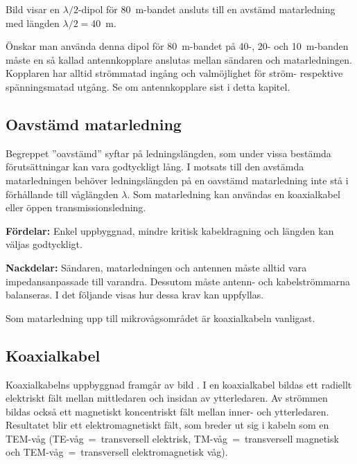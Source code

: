 
Bild  visar en \(\lambda/2\)-dipol för 80~m-bandet ansluts
till en avstämd matarledning med längden \(\lambda/2 = 40\)~m.

Önskar man använda denna dipol för 80~m-bandet på 40-, 20- och 10~m-banden
måste en så kallad antennkopplare anslutas mellan sändaren och matarledningen.
Kopplaren har alltid strömmatad ingång och valmöjlighet för ström- respektive
spänningsmatad utgång.
Se om antennkopplare sist i detta kapitel.

\subsection{Oavstämd matarledning}
\label{oavstämd_matarledning}

Begreppet ''oavstämd'' syftar på ledningslängden, som under vissa
bestämda förutsättningar kan vara godtyckligt lång.
I motsats till den avstämda matarledningen behöver ledningslängden på en
oavstämd matarledning inte stå i förhållande till våglängden \(\lambda\).
Som matarledning kan användas en koaxialkabel eller öppen transmissionsledning.

\textbf{Fördelar:}
Enkel uppbyggnad, mindre kritisk kabeldragning och längden kan väljas godtyckligt.

\textbf{Nackdelar:}
Sändaren, matarledningen och antennen måste alltid vara impedansanpassade till
varandra.
Dessutom måste antenn- och kabelströmmarna balanseras.
I det följande visas hur dessa krav kan uppfyllas.

Som matarledning upp till mikrovågsområdet är koaxialkabeln vanligast.

\subsection{Koaxialkabel}


Koaxialkabelns uppbyggnad framgår av bild .
I en koaxialkabel bildas ett radiellt elektriskt fält mellan mittledaren och
insidan av ytterledaren.
Av strömmen bildas också ett magnetiskt koncentriskt fält mellan inner- och
ytterledaren.
Resultatet blir ett elektromagnetiskt fält, som breder ut sig i kabeln som en
TEM-våg (TE-våg~=~transversell elektrisk, TM-våg~=~transversell magnetisk och
TEM-våg~=~transversell elektromagnetisk våg).

